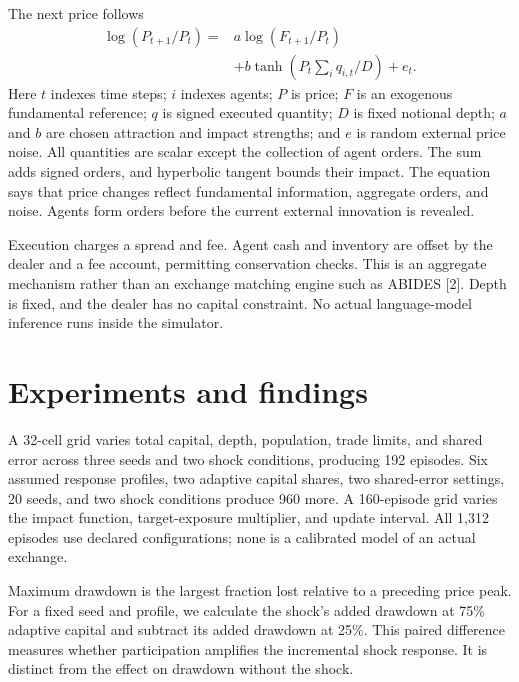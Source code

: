 \documentclass[10pt,letterpaper,twocolumn]{article}
\begin{document}
The next price follows
\begin{align}
 \log(P_{t+1}/P_t)={}&a\log(F_{t+1}/P_t)\nonumber\\
 &+b\tanh(P_t\sum_iq_{i,t}/D)+e_t.
\end{align}
Here $t$ indexes time steps; $i$ indexes agents; $P$ is price; $F$ is an exogenous fundamental reference; $q$ is signed executed quantity; $D$ is fixed notional depth; $a$ and $b$ are chosen attraction and impact strengths; and $e$ is random external price noise. All quantities are scalar except the collection of agent orders. The sum adds signed orders, and hyperbolic tangent bounds their impact. The equation says that price changes reflect fundamental information, aggregate orders, and noise. Agents form orders before the current external innovation is revealed.

Execution charges a spread and fee. Agent cash and inventory are offset by the dealer and a fee account, permitting conservation checks. This is an aggregate mechanism rather than an exchange matching engine such as ABIDES [2]. Depth is fixed, and the dealer has no capital constraint. No actual language-model inference runs inside the simulator.

\section{Experiments and findings}
A 32-cell grid varies total capital, depth, population, trade limits, and shared error across three seeds and two shock conditions, producing 192 episodes. Six assumed response profiles, two adaptive capital shares, two shared-error settings, 20 seeds, and two shock conditions produce 960 more. A 160-episode grid varies the impact function, target-exposure multiplier, and update interval. All 1,312 episodes use declared configurations; none is a calibrated model of an actual exchange.

Maximum drawdown is the largest fraction lost relative to a preceding price peak. For a fixed seed and profile, we calculate the shock's added drawdown at 75\% adaptive capital and subtract its added drawdown at 25\%. This paired difference measures whether participation amplifies the incremental shock response. It is distinct from the effect on drawdown without the shock.
\end{document}
